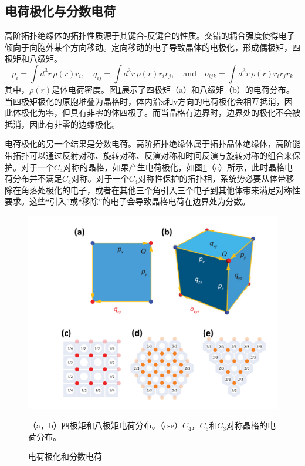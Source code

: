 \subsection{电荷极化与分数电荷}
高阶拓扑绝缘体的拓扑性质源于其键合-反键合的性质。交错的耦合强度使得电子倾向于向胞外某个方向移动。定向移动的电子导致晶体的电极化，形成偶极矩，四极矩和八级矩。
\begin{equation}
p_i = \int d^3r \, \rho(r) r_i, \quad 
q_{ij} = \int d^3r \, \rho(r) r_i r_j, \quad \text{and} \quad
o_{ijk} = \int d^3r \, \rho(r) r_i r_j r_k
\end{equation}
其中，$\rho(r)$是体电荷密度。图\ref{fig:polarization}展示了四极矩（a）和八级矩（b）的电荷分布。当四极矩极化的原胞堆叠为晶格时，体内沿x和y方向的电荷极化会相互抵消，因此体极化为零，但具有非零的体四极子。而当晶格有边界时，边界处的极化不会被抵消，因此有非零的边缘极化。

电荷极化的另一个结果是分数电荷\cite{benalcazar2019quantization}。高阶拓扑绝缘体属于拓扑晶体绝缘体\cite{xie2021higher,noh2018topological}，高阶能带拓扑可以通过反射对称\cite{langbehn2017reflection}、旋转对称\cite{schindler2018higher}、反演对称\cite{khalaf2018higher}和时间反演与旋转对称的组合\cite{geier2018second}来保护。对于一个$C_4$对称的晶格，如果产生电荷极化，如图\ref{fig:polarization}（c）所示，此时晶格电荷分布并不满足$C_4$对称。对于一个$C_4$对称性保护的拓扑相，系统势必要从体带移除在角落处极化的电子，或者在其他三个角引入三个电子到其他体带来满足对称性要求。这些“引入”或“移除”的电子会导致晶格电荷在边界处为分数。

\begin{figure}[htbp]
    \centering
    \includegraphics[width=0.75\linewidth]{figure/Introduction/polarization.png}
    \caption{电荷极化和分数电荷}（a，b）四极矩和八极矩电荷分布。（c-e）$C_4$，$C_6$和$C_3$对称晶格的电荷分布。
    \label{fig:polarization}
\end{figure}

